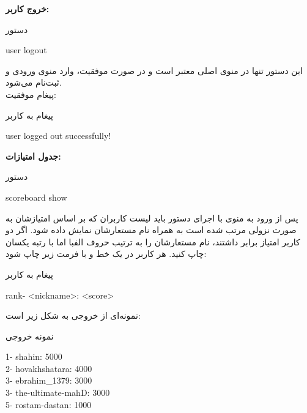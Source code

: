 \documentclass[]{article}
\begin{document}
\vspace{.5cm}
\textbf{خروج کاربر:}
\begin{mybox}[colback=yellow]{دستور}
	\begin{latin}	
		user logout
	\end{latin}
\end{mybox}
این دستور تنها در منوی اصلی معتبر است و در صورت موفقیت، وارد منوی ورودی و 
ثبت‌نام می‌شود.
\\
پیغام موفقیت:
\begin{mybox}[colback=yellow]{پیغام به کاربر}
	\begin{latin}	
		user logged out successfully!
	\end{latin}
\end{mybox}

\vspace{.5cm}
\textbf{جدول امتیازات:}
\begin{mybox}[colback=yellow]{دستور}
	\begin{latin}	
		scoreboard show
	\end{latin}
\end{mybox}
پس از ورود به منوی  با اجرای دستور باید لیست کاربران که بر 
اساس امتیازشان به صورت نزولی مرتب شده است به همراه نام مستعارشان نمایش داده 
شود. اگر دو کاربر امتیاز برابر داشتند، نام مستعارشان را به ترتیب حروف الفبا 
اما با رتبه یکسان چاپ کنید. هر کاربر در یک خط و با فرمت زیر چاپ شود:
\begin{mybox}[colback=yellow]{پیغام به کاربر}
	\begin{latin}	
		rank- <nickname>: <score>
	\end{latin}
\end{mybox}
نمونه‌ای از خروجی به شکل زیر است:
\begin{mybox}[colback=yellow]{نمونه خروجی}
	\begin{latin}	
		1- shahin: 5000 \\
		2- hovakhshatara: 4000 \\
		3- ebrahim\_1379: 3000 \\
		3- the-ultimate-mahD: 3000 \\
		5- rostam-dastan: 1000
	\end{latin}
\end{mybox}
\end{document}
